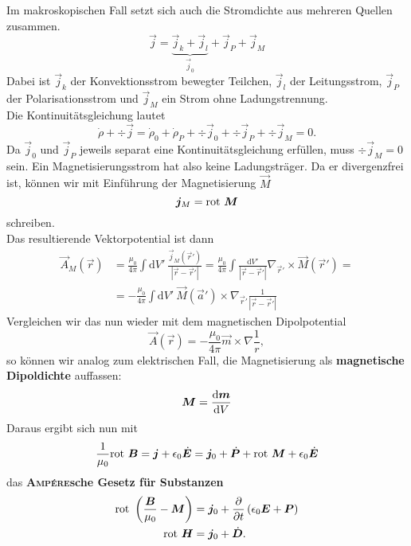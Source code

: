 Im makroskopischen Fall setzt sich auch die Stromdichte aus mehreren Quellen zusammen.
\begin{equation*}
\vec{j} = \underbrace{\vec{j}_k+\vec{j}_l}_{\vec{j}_0} + \vec{j}_P + \vec{j}_M
\end{equation*}
Dabei ist $\vec{j}_k$ der Konvektionsstrom bewegter Teilchen, $\vec{j}_l$ der Leitungsstrom, $\vec{j}_P$ der Polarisationsstrom und $\vec{j}_M$ ein Strom ohne Ladungstrennung. \\
Die Kontinuitätsgleichung lautet
\begin{equation*}
\dot{\rho}+\div\vec{j} = \dot{\rho}_0 + \dot{\rho}_P + \div\vec{j}_0 + \div\vec{j}_P + \div\vec{j}_M = 0.
\end{equation*}
Da $\vec{j}_0$ und $\vec{j}_P$ jeweils separat eine Kontinuitätsgleichung erfüllen, muss $\div\vec{j}_M=0$ sein. Ein Magnetisierungsstrom hat also keine Ladungsträger. Da er divergenzfrei ist, können wir mit Einführung der Magnetisierung $\vec{M}$
\begin{equation*}
\bm{j}_M  = \text{rot }\bm{M}
\end{equation*}
schreiben.\\
Das resultierende Vektorpotential ist dann
\begin{align*}
\vec{A}_M(\vec{r}) &= \frac{\mu_0}{4\pi}\int\mathrm{d}V'\  \frac{\vec{j}_M(\vec{r}')}{|\vec{r}-\vec{r}'|} = \frac{\mu_0}{4\pi}\int\frac{\mathrm{d}V'}{|\vec{r}-\vec{r}'|}\nabla_{\vec{r}'}\times\vec{M}(\vec{r}') = \\
&=-\frac{\mu_0}{4\pi}\int\mathrm{d}V'\ \vec{M}(\vec{a}')\times\nabla_{\vec{r}'}\frac{1}{|\vec{r}-\vec{r}'|}
\end{align*}
Vergleichen wir das nun wieder mit dem magnetischen Dipolpotential
\begin{equation*}
\vec{A}(\vec{r}) = -\frac{\mu_0}{4\pi}\vec{m}\times\nabla\frac{1}{r},
\end{equation*}
so können wir analog zum elektrischen Fall, die Magnetisierung als \textbf{magnetische Dipoldichte} auffassen:
\begin{equation*}
\bm{M} = \frac{\mathrm{d}{\bm{m}}}{\mathrm{d}{V}}
\end{equation*}
Daraus ergibt sich nun mit
\begin{equation*}
\frac{1}{\mu_0}\text{rot }\bm{B}=\bm{j} + \epsilon_0\dot{\bm{E}} = \bm{j}_0 + \dot{\bm{P}} + \text{rot }\bm{M} + \epsilon_0\dot{\bm{E}}
\end{equation*}
das \textbf{\textsc{Ampére}sche Gesetz für Substanzen}
\begin{align*}
\text{rot }\left(\frac{\bm{B}}{\mu_0}-\bm{M}\right) & = \bm{j}_0 + \frac{\partial{}}{\partial{t}}\left(\epsilon_0\bm{E}+\bm{P}\right)\\
\text{rot }\bm{H} &= \bm{j}_0 + \dot{\bm{D}}.
\end{align*}
